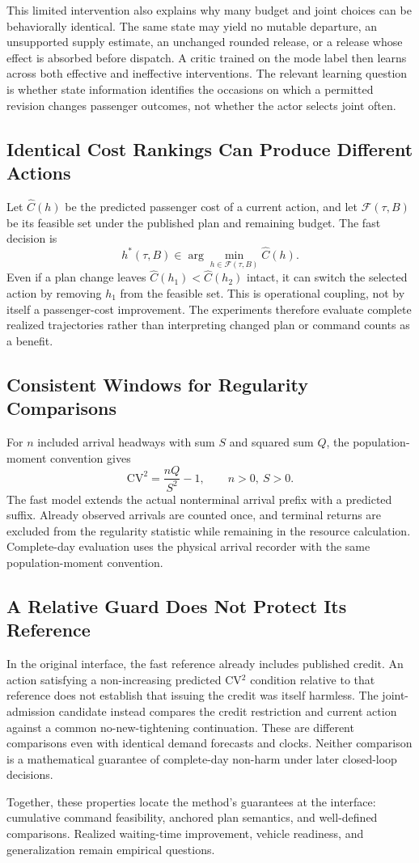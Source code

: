 This limited intervention also explains why many budget and joint choices can be behaviorally identical. The same state may yield no mutable departure, an unsupported supply estimate, an unchanged rounded release, or a release whose effect is absorbed before dispatch. A critic trained on the mode label then learns across both effective and ineffective interventions. The relevant learning question is whether state information identifies the occasions on which a permitted revision changes passenger outcomes, not whether the actor selects joint often.

\subsection{Identical Cost Rankings Can Produce Different Actions}
Let $\widehat C(h)$ be the predicted passenger cost of a current action, and let $\mathcal F(\tau,B)$ be its feasible set under the published plan and remaining budget. The fast decision is
\begin{equation}
 h^*(\tau,B)\in\arg\min_{h\in\mathcal F(\tau,B)}\widehat C(h).
\end{equation}
Even if a plan change leaves $\widehat C(h_1)<\widehat C(h_2)$ intact, it can switch the selected action by removing $h_1$ from the feasible set. This is operational coupling, not by itself a passenger-cost improvement. The experiments therefore evaluate complete realized trajectories rather than interpreting changed plan or command counts as a benefit.

\subsection{Consistent Windows for Regularity Comparisons}
For $n$ included arrival headways with sum $S$ and squared sum $Q$, the population-moment convention gives
\begin{equation}
 \mathrm{CV}^2=\frac{nQ}{S^2}-1,\qquad n>0,\ S>0.
 \label{eq:cv_moments}
\end{equation}
The fast model extends the actual nonterminal arrival prefix with a predicted suffix. Already observed arrivals are counted once, and terminal returns are excluded from the regularity statistic while remaining in the resource calculation. Complete-day evaluation uses the physical arrival recorder with the same population-moment convention.

\subsection{A Relative Guard Does Not Protect Its Reference}
In the original interface, the fast reference already includes published credit. An action satisfying a non-increasing predicted CV$^2$ condition relative to that reference does not establish that issuing the credit was itself harmless. The joint-admission candidate instead compares the credit restriction and current action against a common no-new-tightening continuation. These are different comparisons even with identical demand forecasts and clocks. Neither comparison is a mathematical guarantee of complete-day non-harm under later closed-loop decisions.

Together, these properties locate the method's guarantees at the interface: cumulative command feasibility, anchored plan semantics, and well-defined comparisons. Realized waiting-time improvement, vehicle readiness, and generalization remain empirical questions.
